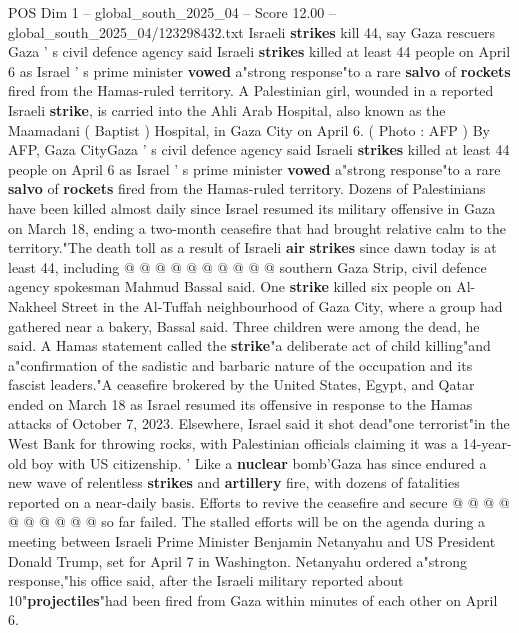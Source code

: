 \begin{textsample}{POS Dim 1 – global\_south\_2025\_04 – Score 12.00 – global\_south\_2025\_04/123298432.txt}  \label{ex:f1_pos_325}
Israeli \textbf{strikes} kill 44, say Gaza rescuers Gaza ' s civil defence agency said Israeli \textbf{strikes} killed at least 44 people on April 6 as Israel ' s prime minister \textbf{vowed} a"strong response"to a rare \textbf{salvo} of \textbf{rockets} fired from the Hamas-ruled territory.
A Palestinian girl, wounded in a reported Israeli \textbf{strike}, is carried into the Ahli Arab Hospital, also known as the Maamadani ( Baptist ) Hospital, in Gaza City on April 6. ( Photo : AFP ) By AFP, Gaza CityGaza ' s civil defence agency said Israeli \textbf{strikes} killed at least 44 people on April 6 as Israel ' s prime minister \textbf{vowed} a"strong response"to a rare \textbf{salvo} of \textbf{rockets} fired from the Hamas-ruled territory.
Dozens of Palestinians have been killed almost daily since Israel resumed its military offensive in Gaza on March 18, ending a two-month ceasefire that had brought relative calm to the territory."The death toll as a result of Israeli \textbf{air} \textbf{strikes} since dawn today is at least 44, including @ @ @ @ @ @ @ @ @ @ southern Gaza Strip, civil defence agency spokesman Mahmud Bassal said.
One \textbf{strike} killed six people on Al-Nakheel Street in the Al-Tuffah neighbourhood of Gaza City, where a group had gathered near a bakery, Bassal said.
Three children were among the dead, he said.
A Hamas statement called the \textbf{strike}"a deliberate act of child killing"and a"confirmation of the sadistic and barbaric nature of the occupation and its fascist leaders."A ceasefire brokered by the United States, Egypt, and Qatar ended on March 18 as Israel resumed its offensive in response to the Hamas attacks of October 7, 2023.
Elsewhere, Israel said it shot dead"one terrorist"in the West Bank for throwing rocks, with Palestinian officials claiming it was a 14-year-old boy with US citizenship. ' Like a \textbf{nuclear} bomb'Gaza has since endured a new wave of relentless \textbf{strikes} and \textbf{artillery} fire, with dozens of fatalities reported on a near-daily basis.
Efforts to revive the ceasefire and secure @ @ @ @ @ @ @ @ @ @ so far failed.
The stalled efforts will be on the agenda during a meeting between Israeli Prime Minister Benjamin Netanyahu and US President Donald Trump, set for April 7 in Washington.
Netanyahu ordered a"strong response,"his office said, after the Israeli military reported about 10"\textbf{projectiles}"had been fired from Gaza within minutes of each other on April 6.

\end{textsample}
